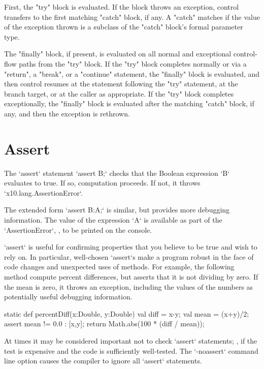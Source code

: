 First, the \xcd"try" block is evaluated.  If the block throws an
exception, control transfers to the first matching \xcd"catch"
block, if any.  A \xcd"catch" matches if the value of the
exception thrown is a subclass of the \xcd"catch" block's formal
parameter type.

The \xcd"finally" block, if present, is evaluated on all normal
and exceptional control-flow paths from the \xcd"try" block.
If the \xcd"try" block completes normally
or via a \xcd"return", a \xcd"break", or a
\xcd"continue" statement, 
the \xcd"finally"
block is evaluated, and then control resumes at
the statement following the \xcd"try" statement, at the branch target, or at
the caller as appropriate.
If the \xcd"try" block completes
exceptionally, the \xcd"finally" block is evaluated after the
matching \xcd"catch" block, if any, and then the
exception is rethrown.




\section{Assert}

The \xcd`assert` statement 
\xcd`assert B;` 
checks that the Boolean expression \xcd`B` evaluates to true.  If so,
computation proceeds.  If not, it throws \xcd`x10.lang.AssertionError`.

The extended form 
\xcd`assert B:A;`
is similar, but provides more debugging information.  The value of the
expression \xcd`A` is available as part of the \xcd`AssertionError`, \eg, to
be printed on the console.

\begin{ex}
\xcd`assert` is useful for confirming properties that you believe to be true
and wish to rely on.  In particular, well-chosen \xcd`assert`s make a program
robust in the face of code changes and unexpected uses of methods.
For example, the following method compute percent differences, but asserts
that it is not dividing by zero.  If the mean is zero, it throws an exception,
including the values of the numbers as potentially useful debugging
information. 
\begin{xten}
static def percentDiff(x:Double, y:Double) {
  val diff = x-y;
  val mean = (x+y)/2;
  assert mean != 0.0  : [x,y]; 
  return Math.abs(100 * (diff / mean));
}
\end{xten}

\end{ex}


At times it may be considered important not to check \xcd`assert` statements;
\eg, if the test is expensive and the code is sufficiently well-tested.  The
\xcd`-noassert` command line option causes the compiler to ignore all
\xcd`assert` statements. 
